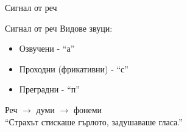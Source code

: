 \documentclass[9pt]{beamer}
\begin{document}
    \begin{frame}{Сигнал от реч}
    \end{frame}

    \begin{frame}{Сигнал от реч}
    Видове звуци:
    \vspace{1cm}\\
    \pause
    \begin{itemize}
        \item Озвучени - ``а''
        \pause
        \item Проходни (фрикативни) - ``с''
        \pause
        \item Преградни - ``п'' 
    \end{itemize}
    \vspace{1cm}
    \pause
    Реч \pause$\rightarrow$ думи \pause $\rightarrow$ фонеми 
    \vspace{1cm}\\
    \pause
    ``Страхът стискаше гърлото, задушаваше гласа.''
    \end{frame}
\end{document}
